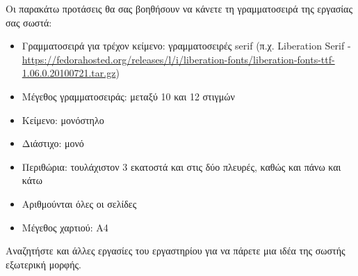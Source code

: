 Οι παρακάτω προτάσεις θα σας βοηθήσουν να κάνετε τη γραμματοσειρά της εργασίας σας σωστά:
\begin{itemize}
\item Γραμματοσειρά για τρέχον κείμενο: γραμματοσειρές serif (π.χ. Liberation Serif - \url{https://fedorahosted.org/releases/l/i/liberation-fonts/liberation-fonts-ttf-1.06.0.20100721.tar.gz})
\item Μέγεθος γραμματοσειράς: μεταξύ 10 και 12 στιγμών
\item Κείμενο: μονόστηλο
\item Διάστιχο: μονό
\item Περιθώρια: τουλάχιστον 3 εκατοστά και στις δύο πλευρές, καθώς και πάνω και κάτω
\item Αριθμούνται όλες οι σελίδες
\item Μέγεθος χαρτιού: A4
\end{itemize}
Αναζητήστε και άλλες εργασίες του εργαστηρίου για να πάρετε μια ιδέα της σωστής εξωτερική μορφής.
